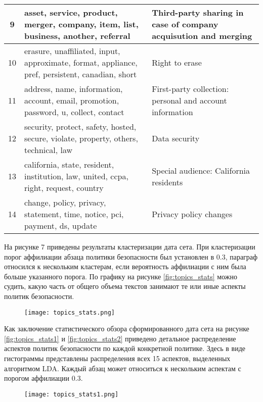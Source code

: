 \documentclass[../main]{subfiles}
\begin{document}
\begin{longtable}[H]{
    |c
    |>{\setstretch{1}}m{}
    |>{\setstretch{1}}m{}|}
    9 & asset, service, product, merger, company, item, list, business, another, referral & Third-party sharing in case of company acquisution and merging \\\hline
    10 & erasure, unaffiliated, input, approximate, format, appliance, pref, persistent, canadian, short & Right to erase \\\hline
    11 & address, name, information, account, email, promotion, password, u, collect, contact & First-party collection: personal and account information \\\hline
    12 & security, protect, safety, hosted, secure, violate, property, others, technical, law & Data security \\\hline
    13 & california, state, resident, institution, law, united, ccpa, right, request, country & Special audience: California residents \\\hline
    14 & change, policy, privacy, statement, time, notice, pci, payment, ds, update & Privacy policy changes \\\hline
\end{longtable}

На рисунке 7 приведены результаты кластеризации дата сета. При кластеризации порог аффилиации абзаца политики безопасности был установлен в 0.3, параграф относился к нескольким кластерам, если вероятность аффилиации с ним была больше указанного порога. По графику на рисунке \ref{fig:topics_stats} можно судить, какую часть от общего объема текстов занимают те или иные аспекты политик безопасности.

\begin{figure}[H]
    \centering
    {\texttt{[image: topics\_stats.png]}}
    \vspace{-\baselineskip}
\end{figure}

Как заключение статистического обзора сформированного дата сета на рисунке \ref{fig:topics_stats1} и \ref{fig:topics_stats2} приведено детальное распределение аспектов политик безопасности по каждой конкретной политике. Здесь в виде гистограммы представлены распределения всех 15 аспектов, выделенных алгоритмом LDA. Каждый абзац может относиться к нескольким аспектам с порогом аффилиации 0.3.

\begin{figure}[H]
    \centering
    {\texttt{[image: topics\_stats1.png]}}
    \vspace{-\baselineskip}
\end{figure}
\end{document}
